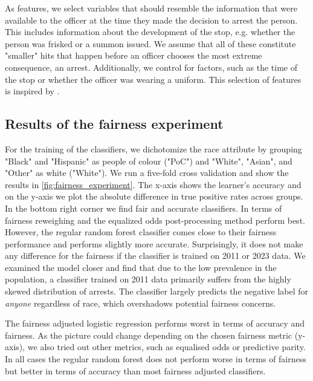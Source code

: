 As features, we select variables that should resemble the information that were available to the officer at the time they made the decision to arrest the person. This includes information about the development of the stop, e.g. whether the person was frisked or a summon issued. We assume that all of these constitute "smaller" hits that happen before an officer chooses the most extreme consequence, an arrest. Additionally, we control for factors, such as the time of the stop or whether the officer was wearing a uniform. This selection of features is inspired by \cite{Badr2022DTFANSP}.

\subsection{Results of the fairness experiment}
For the training of the classifiers, we dichotomize the race attribute by grouping "Black" and "Hispanic" as people of colour ("PoC") and "White", "Asian", and "Other" as white ("White"). We run a five-fold cross validation and show the results in \autoref{fig:fairness_experiment}. The x-axis shows the learner's accuracy and on the y-axis we plot the absolute difference in true positive rates across groups. In the bottom right corner we find fair and accurate classifiers. In terms of fairness reweighing and the equalized odds post-processing method perform best. However, the regular random forest classifier comes close to their fairness performance and performs slightly more accurate. Surprisingly, it does not make any difference for the fairness if the classifier is trained on 2011 or 2023 data.
We examined the model closer and find that due to the low prevalence in the population, a classifier trained on 2011 data primarily suffers from the highly skewed distribution of arrests. The classifier largely predicts the negative label for \textit{anyone} regardless of race, which overshadows potential fairness concerns.\par
The fairness adjusted logistic regression performs worst in terms of accuracy and fairness.
As the picture could change depending on the chosen fairness metric (y-axis), we also tried out other metrics, such as equalised odds or predictive parity. In all cases the regular random forest does not perform worse in terms of fairness but better in terms of accuracy than most fairness adjusted classifiers.
